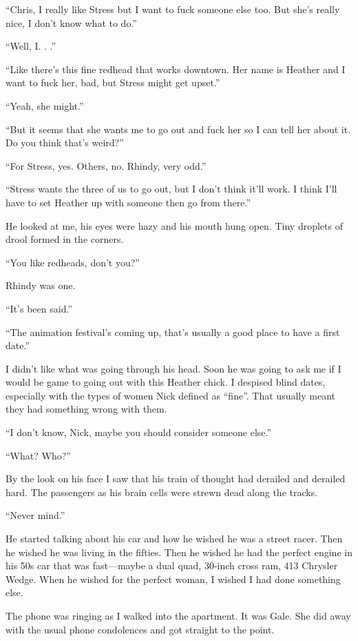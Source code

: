``Chris, I really like Stress but I want to fuck someone else too. But
she's really nice, I don't know what to do.''

``Well, I. . .''

``Like there's this fine redhead that works downtown. Her name is
Heather and I want to fuck her, bad, but Stress might get upset.''

``Yeah, she might.''

``But it seems that she wants me to go out and fuck her so I can tell
her about it. Do you think that's weird?''

``For Stress, yes. Others, no. Rhindy, very odd.''

``Stress wants the three of us to go out, but I don't think it'll work.
I think I'll have to set Heather up with someone then go from there.''

He looked at me, his eyes were hazy and his mouth hung open. Tiny
droplets of drool formed in the corners.

``You like redheads, don't you?''

Rhindy was one.

``It's been said.''

``The animation festival's coming up, that's usually a good place to
have a first date.''

I didn't like what was going through his head. Soon he was going to ask
me if I would be game to going out with this Heather chick. I despised
blind dates, especially with the types of women Nick defined as
``fine''. That usually meant they had something wrong with them.

``I don't know, Nick, maybe you should consider someone else.''

``What? Who?''

By the look on his face I saw that his train of thought had derailed and
derailed hard. The passengers as his brain cells were strewn dead along
the tracks.

``Never mind.''

He started talking about his car and how he wished he was a street
racer. Then he wished he was living in the fifties. Then he wished he
had the perfect engine in his 50s car that was fast---maybe a dual quad,
30-inch cross ram, 413 Chrysler Wedge. When he wished for the perfect
woman, I wished I had done something else.

The phone was ringing as I walked into the apartment. It was Gale. She
did away with the usual phone condolences and got straight to the point.

